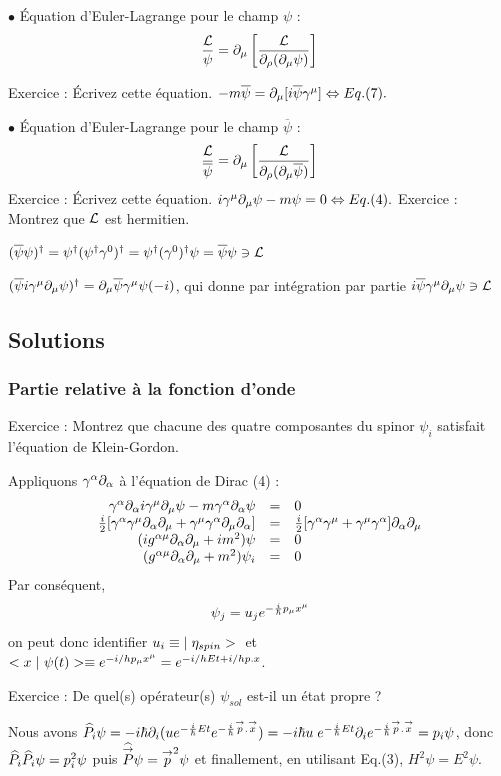 $\bullet$ Équation d’Euler-Lagrange pour le champ $\psi$ :
\[
\frac{\mathcal{L}}{\psi}=\partial_\mu\left[\frac{\mathcal{L}}{\partial_\rho(\partial_\mu\psi)}\right]
\]

Exercice : Écrivez cette équation.
$-m\overline{\psi}=\partial_\mu[i\overline{\psi}\gamma^\mu]\Leftrightarrow Eq.(7).$

$\bullet$ Équation d’Euler-Lagrange pour le champ $\overline{\psi}$ :
\[
\frac{\mathcal{L}}{\overline{\psi}}=
\partial_\mu\left[\frac{\mathcal{L}}{\partial_\rho(\partial_\mu\overline{\psi})}\right]
\]
Exercice : Écrivez cette équation.
$i\gamma^\mu\partial_\mu\psi-m\psi=0\Leftrightarrow Eq.(4).$
Exercice : Montrez que $\mathcal{L}$ est hermitien.

$(\overline{\psi}\psi)^\dagger=
\psi^\dagger(\psi^\dagger\gamma^0)^\dagger=
\psi^\dagger(\gamma^0)^\dagger\psi=
\overline{\psi}\psi\ni\mathcal{L}$

$(\overline{\psi}i\gamma^\mu\partial_\mu\psi)^\dagger=
\partial_\mu\overline{\psi}\gamma^\mu\psi(-i)$,
qui donne par intégration par partie
$i\overline{\psi}\gamma^\mu\partial_\mu\psi\ni\mathcal{L}$
\subsection{Solutions}
\subsubsection{Partie relative à la fonction d'onde}
Exercice : Montrez que chacune des quatre composantes du spinor $\psi_i$ satisfait
l’équation de Klein-Gordon.

Appliquons $\gamma^\alpha\partial_\alpha$ à l’équation de Dirac (4) :
\[\begin{array}{ r c l }
\gamma^\alpha\partial_\alpha i\gamma^\mu\partial_\mu\psi - m\gamma^\alpha\partial_\alpha\psi & = & 0 \\
\frac{i}{2}[\gamma^\alpha\gamma^\mu\partial_\alpha\partial_\mu+\gamma^\mu\gamma^\alpha\partial_\mu\partial_\alpha] & = & \frac{i}{2}[\gamma^\alpha\gamma^\mu+\gamma^\mu\gamma^\alpha]\partial_\alpha\partial_\mu \\
(ig^{\alpha\mu}\partial_\alpha\partial_\mu+im^2)\psi & = & 0 \\
(g^{\alpha\mu}\partial_\alpha\partial_\mu+m^2)\psi_i & = & 0 \\
\end{array}\]
Par conséquent,
\[
\psi_j=u_je^{-\frac{i}{\hbar} p_\mu x^\mu}
\]
on peut donc identifier $u_i\equiv|\;{\eta_{spin}}>\;$ et $<{x}\;|\ {\psi(t)}>\equiv
e^{-i/h p_\mu x^\mu}=e^{-i/h Et+i/h p.x}$.

Exercice : De quel(s) opérateur(s) $\psi_{sol}$ est-il un état propre ?

Nous avons $\widehat{P}_i\psi=
-i\hbar\partial_i(ue^{-\frac{i}{\hbar} Et}e^{-\frac{i}{\hbar}{\overset{\rightarrow}{p}}.{\overset{\rightarrow}{x}}})=
-i\hbar u\; e^{-\frac{i}{\hbar} Et}\partial_ie^{-\frac{i}{\hbar}{\overset{\rightarrow}{p}}.{\overset{\rightarrow}{x}}}=
p_i\psi$, donc $\widehat{P}_i\widehat{P}_i\psi=p_i^2\psi$ puis $\widehat{{\overset{\rightarrow}{P}}}\psi={\overset{\rightarrow}{p}}^2\psi$
et finallement, en utilisant Eq.(3), $H^2\psi=E^2\psi$.

